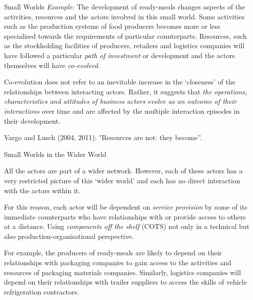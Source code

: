 \documentclass{beamer}
\begin{document}
\begin{frame}{Small Worlds}
\emph{Example:} The development of ready-meals changes aspects of the
activities, resources and the actors involved in this small world. Some
activities such as the production systems of food producers becomes more or
less specialised towards the requirements of particular counterparts.
Resources, such as the stockholding facilities of producers, retailers and
logistics companies will have followed a particular \emph{path of investment}
or development and the actors themselves will have \emph{co-evolved}.

Co-evolution does not refer to an inevitable increase in the ‘closeness’ of
the relationships between interacting actors. Rather, it suggests that
\emph{the operations, characteristics and attitudes of business actors evolve
  as an outcome of their interactions} over time and are affected by the
multiple interaction episodes in their development.

Vargo and Lusch (2004, 2011): "Resources are not: they become”.

\end{frame}

\begin{frame}{Small Worlds in the Wider World}

All the actors are part of a wider network. However, each of these actors has
a very restricted picture of this ‘wider world’ and each has no direct
interaction with the actors within it.

For this reason, each actor will be dependent on \emph{service provision} by
some of its immediate counterparts who have relationships with or provide
access to others at a distance. Using \emph{components off the shelf} (COTS)
not only in a technical but also production-organisational perspective.

For example, the producers of ready-meals are likely to depend on their
relationships with packaging companies to gain access to the activities and
resources of packaging materials companies. Similarly, logistics companies
will depend on their relationships with trailer suppliers to access the skills
of vehicle refrigeration contractors.

\end{frame}
\end{document}
